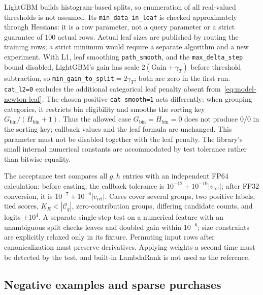 \documentclass[12pt,a4paper]{article}
\newcommand{\code}[1]{{\ttfamily\small\nolinkurl{#1}}}
\theoremstyle{plainru}
\begin{document}
LightGBM builds histogram-based splits, so enumeration of all
real-valued thresholds is not assumed. Its \code{min\_data\_in\_leaf}
is checked approximately through Hessians: it is a row parameter,
not a query parameter or a strict guarantee of $100$ actual rows.
Actual leaf sizes are published by routing the training rows;
a strict minimum would require a separate
algorithm and a new experiment. With L1, leaf smoothing
\code{path_smooth}, and the \code{max_delta_step} bound disabled,
LightGBM's gain has scale
$2(\mathrm{Gain}+\gamma_T)$ before threshold subtraction, so
\code{min\_gain\_to\_split}$=2\gamma_T$; both are zero
in the first run. \code{cat_l2=0} excludes the additional categorical leaf penalty
absent from~\eqref{eq:model-newton-leaf}.
The chosen positive \code{cat_smooth=1} acts differently:
when grouping categories, it restricts bin eligibility and smooths
the sorting key $G_{\mathrm{bin}}/(H_{\mathrm{bin}}+1)$.
Thus the allowed case $G_{\mathrm{bin}}=H_{\mathrm{bin}}=0$ does not produce
$0/0$ in the sorting key; callback values and the leaf formula are unchanged.
This parameter must not be disabled together with the leaf penalty.
The library's small internal numerical constants
are accommodated by test tolerance rather than bitwise equality.

The acceptance test compares all $g,h$ entries with an independent FP64
calculation: before casting, the callback tolerance is
$10^{-12}+10^{-10}|v_{\mathrm{ref}}|$; after FP32 conversion, it is
$10^{-7}+10^{-6}|v_{\mathrm{ref}}|$. Cases cover several groups,
two positive labels, tied scores, $K_R<|\mathcal C_q|$,
zero-contribution groups, differing candidate counts, and logits $\pm10^4$.
A separate single-step test on a numerical feature with an unambiguous
split checks leaves and doubled gain within $10^{-6}$;
size constraints are explicitly relaxed only in its fixture.
Permuting input rows after canonicalization must preserve
derivatives. Applying weights a second time must be detected
by the test, and built-in LambdaRank is not used as the reference.

\subsection{Negative examples and sparse purchases}
\end{document}
